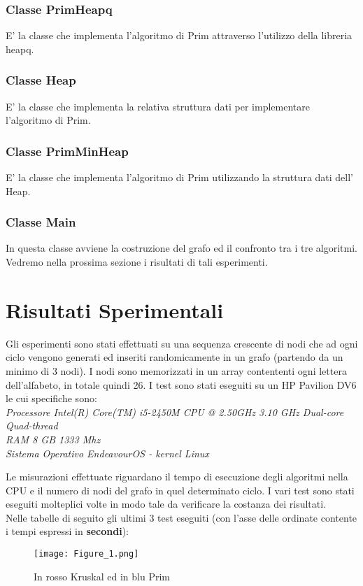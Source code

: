 \documentclass{article}
\begin{document}
\subsubsection{Classe PrimHeapq}
E' la classe che implementa l'algoritmo di Prim attraverso l'utilizzo della libreria heapq.

\subsubsection{Classe Heap}
E' la classe che implementa la relativa struttura dati per implementare l'algoritmo di Prim.

\subsubsection{Classe PrimMinHeap}
E' la classe che implementa l'algoritmo di Prim utilizzando la struttura dati dell' Heap.

\subsubsection{Classe Main}
In questa  classe avviene la costruzione del grafo ed il confronto tra i tre algoritmi.
Vedremo nella prossima sezione i risultati di tali esperimenti.

\clearpage

\section{Risultati Sperimentali}
Gli esperimenti sono stati effettuati su una sequenza crescente di nodi che ad ogni ciclo vengono generati ed inseriti randomicamente in un grafo (partendo da un minimo di 3 nodi).
I nodi sono memorizzati in un array contententi ogni lettera dell'alfabeto, in totale quindi 26.
I test sono stati eseguiti su un HP Pavilion DV6 le cui specifiche sono:\\
\textit{Processore Intel(R) Core(TM) i5-2450M CPU @ 2.50GHz 3.10 GHz Dual-core Quad-thread\\}
\textit{RAM 8 GB 1333 Mhz\\}
\textit{Sistema Operativo EndeavourOS - kernel Linux\\}

Le misurazioni effettuate riguardano il tempo di esecuzione degli algoritmi nella CPU e il numero di nodi del grafo in quel determinato ciclo.
I vari test sono stati eseguiti molteplici volte in modo tale da verificare la costanza dei risultati.\\
Nelle tabelle di seguito gli ultimi 3 test eseguiti (con l'asse delle ordinate contente i tempi espressi in \textbf{secondi}):
\begin{figure}[!hb]
        \centering
        \texttt{[image: Figure\_1.png]}
        \caption{In rosso Kruskal ed in blu Prim}
        \label{fig:KruskalvsPrim}
\end{figure}
\end{document}
